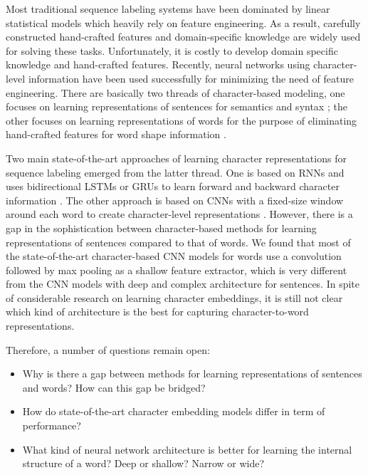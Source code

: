 \documentclass[11pt,a4paper]{article}
\begin{document}
Most traditional sequence labeling systems have been dominated by linear statistical models which heavily rely on feature engineering. As a result, carefully constructed hand-crafted features and domain-specific knowledge are widely used for solving these tasks. Unfortunately, it is costly to develop domain specific knowledge and hand-crafted features. Recently, neural networks using character-level information have been used successfully for minimizing the need of feature engineering. There are basically two threads of character-based modeling, one focuses on learning representations of sentences for semantics and syntax \cite{zhang2015character,conneau2017very}; the other focuses on learning representations of words for the purpose of eliminating hand-crafted features for word shape information \cite{lample2016neural,ma2016end}.

Two main state-of-the-art approaches of learning character representations for sequence labeling emerged from the latter thread. One is based on RNNs and uses bidirectional LSTMs or GRUs to learn forward and backward character information \cite{ling2015finding,lample2016neural,yang2017transfer}. The other approach is based on CNNs with a fixed-size window around each word to create character-level representations \cite{santos2014learning,chiu2015named,ma2016end}. However, there is a gap in the sophistication between character-based methods for learning representations of sentences compared to that of words. We found that most of the state-of-the-art character-based CNN models for words use a convolution followed by max pooling as a shallow feature extractor, which is very different from the CNN models with deep and complex architecture for sentences. In spite of considerable research on learning character embeddings, it is still not clear which kind of architecture is the best for capturing character-to-word representations.

Therefore, a number of questions remain open:

\begin{itemize}
    \item Why is there a gap between methods for learning representations of sentences and words? How can this gap be bridged?
    \item How do state-of-the-art character embedding models differ in term of performance?
    \item What kind of neural network architecture is better for learning the internal structure of a word? Deep or shallow? Narrow or wide?
\end{itemize}
\end{document}
